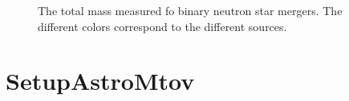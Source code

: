\documentclass[letterpaper,10pt,english]{sphinxmanual}
\begin{document}
\begin{figure}[htbp]
\centering
\capstart

\noindent{}
\caption{The total mass measured fo binary neutron star mergers. The different colors correspond to the different sources.}\label{\detokenize{source/api/setup_astro_mtot:id1}}\end{figure}

\sphinxstepscope


\section{SetupAstroMtov}
\label{\detokenize{source/api/setup_astro_mtov:setupastromtov}}\label{\detokenize{source/api/setup_astro_mtov::doc}}\label{\detokenize{source/api/setup_astro_mtov:module-nucleardatapy.setup_astro_mtov}}
\end{document}
